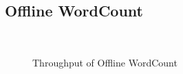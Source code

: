 \subsection{Offline WordCount}
\begin{figure}[t!]
  \begin{center}
  ~
   \caption{Throughput of Offline WordCount}
   \label{fig:offline_throughput}
  \end{center}
\end{figure}

